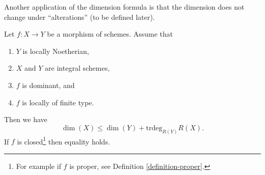 \noindent
Another application of the dimension formula is that the dimension does not
change under ``alterations'' (to be defined later).

\begin{lemma}
\label{lemma-alteration-dimension}
Let $f : X \to Y$ be a morphism of schemes. Assume that
\begin{enumerate}
\item $Y$ is locally Noetherian,
\item $X$ and $Y$ are integral schemes,
\item $f$ is dominant, and
\item $f$ is locally of finite type.
\end{enumerate}
Then we have
$$
\dim(X) \leq \dim(Y) + \text{trdeg}_{R(Y)} R(X).
$$
If $f$ is closed\footnote{For example if $f$ is proper, see
Definition \ref{definition-proper}.} then equality holds.
\end{lemma}


